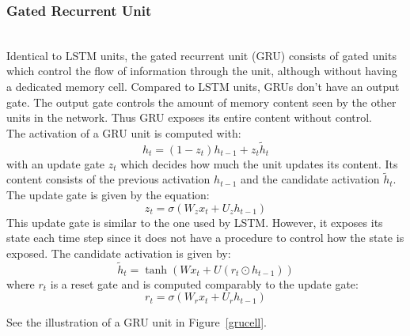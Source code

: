 
\subsubsection{Gated Recurrent Unit}~\\

Identical to LSTM units, the gated recurrent unit (GRU) consists of gated units
which control the flow of information through the unit, although without having
a dedicated memory cell. Compared to LSTM units, GRUs don't have an output gate.
The output gate controls the amount of memory content seen by the other units in
the network. Thus GRU exposes its entire content without
control.~\cite{DBLP:journals/corr/ChungGCB14}\\

The activation of a GRU unit is computed with:
\begin{equation}
  h_t = (1-z_t)h_{t-1} + z_t\tilde{h}_t
\end{equation}
with an update gate $z_t$ which decides how much the unit updates its content.
Its content consists of the previous activation $h_{t-1}$ and the candidate
activation $\tilde{h}_t$. The update gate is given by the equation:
\begin{equation}
  z_t=\sigma(W_z x_t+U_z h_{t-1}) 
\end{equation}
This update gate is similar to the one used by LSTM. However, it exposes its
state each time step since it does not have a procedure to control how the state
is exposed. The candidate activation is given by:
\begin{equation}
  \tilde{h}_t=\tanh(Wx_t+U(r_t\odot h_{t-1}))
\end{equation}
where $r_t$ is a reset gate and is computed comparably to the update gate:
\begin{equation}
  r_t=\sigma(W_r x_t+U_r h_{t-1})
\end{equation}

See the illustration of a GRU unit in Figure~\ref{grucell}.


